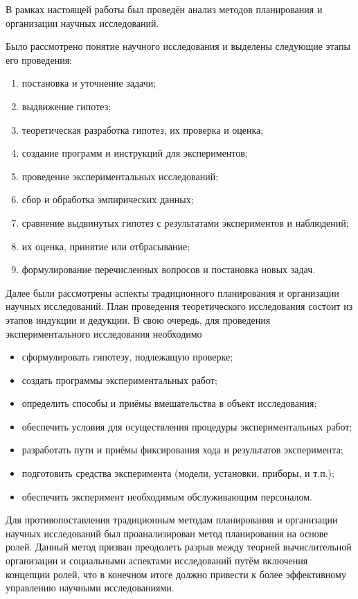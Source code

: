 
В рамках настоящей работы был проведён анализ методов планирования и организации научных исследований. 

Было рассмотрено понятие научного исследования и выделены следующие этапы его проведения:
\begin{enumerate}[label*=\arabic*)]
	\item  постановка и уточнение задачи;
	\item выдвижение гипотез;
	\item теоретическая разработка гипотез, их проверка и оценка;
	\item создание программ и инструкций для экспериментов; 
	\item проведение экспериментальных исследований;
	\item сбор и обработка эмпирических данных;
	\item сравнение выдвинутых гипотез с результатами экспериментов и
	наблюдений;
	\item их оценка, принятие или отбрасывание;
	\item формулирование перечисленных вопросов и постановка новых задач.
\end{enumerate}

Далее были рассмотрены аспекты традиционного планирования и организации научных исследований. План проведения теоретического исследования состоит из этапов индукции и дедукции. В свою очередь, для проведения экспериментального исследования необходимо
\begin{itemize}[label*=---]
	\item сформулировать гипотезу, подлежащую проверке;
	\item создать программы экспериментальных работ;
	\item определить способы и приёмы вмешательства в объект исследования;
	\item обеспечить условия для осуществления процедуры экспериментальных работ;
	\item разработать пути и приёмы фиксирования хода и результатов эксперимента;
	\item подготовить средства эксперимента (модели, установки, приборы, и т.п.);
	\item обеспечить эксперимент необходимым обслуживающим персоналом. 
\end{itemize}

Для противопоставления традиционным методам планирования и организации научных исследований был проанализирован метод планирования на основе ролей. Данный метод призван преодолеть разрыв между теорией вычислительной организации и социальными аспектами исследований путём включения концепции ролей, что в конечном итоге должно привести к более эффективному управлению научными исследованиями.

